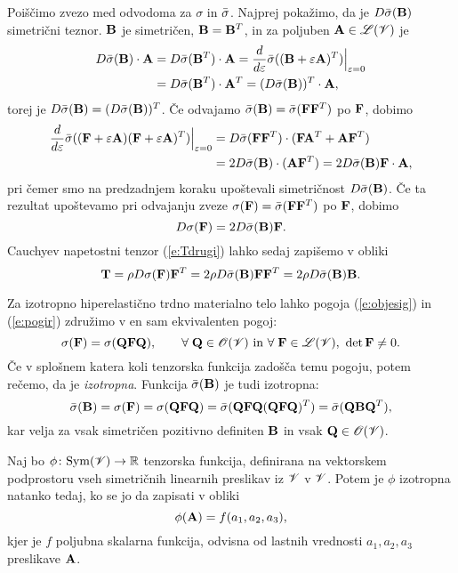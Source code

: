 Poiščimo zvezo med odvodoma za $\sigma$ in $\bar{\sigma}$. Najprej pokažimo, da je $D\bar{\sigma}(\mathbf B)$
simetrični teznor. $\mathbf B$ je simetričen, $\mathbf B=\mathbf B^{T}$, in
za poljuben $\mathbf A\in\mathscr L(\mathscr V)$ je
\begin{align*}
	D\bar{\sigma}(\mathbf B)\cdot\mathbf A&=D\bar{\sigma}(\mathbf B^T)\cdot\mathbf A=
	\frac{d}{d\varepsilon}\bar{\sigma}((\mathbf B+\varepsilon\mathbf A)^T)\Big|_{\varepsilon=0}\\
	&=D\bar{\sigma}(\mathbf B^T)\cdot\mathbf A^T=(D\bar{\sigma}(\mathbf B))^T\cdot\mathbf A,
\end{align*}
torej je $D\bar{\sigma}(\mathbf B)=(D\bar{\sigma}(\mathbf B))^T$. Če odvajamo $\bar{\sigma}(\mathbf B)=\bar{\sigma}(\mathbf F\mathbf F^T)$
po $\mathbf F$, dobimo
\begin{align*}
	\frac{d}{d\varepsilon}\bar{\sigma}((\mathbf F+\varepsilon\mathbf A)(\mathbf F+\varepsilon\mathbf A)^T)\Big|_{\varepsilon=0}&=
	D\bar{\sigma}(\mathbf F\mathbf F^T)\cdot(\mathbf F\mathbf A^T+\mathbf A\mathbf F^T)\\
	&=2D\bar{\sigma}(\mathbf B)\cdot(\mathbf A\mathbf F^T)=2D\bar{\sigma}(\mathbf B)\mathbf F\cdot\mathbf A,
\end{align*}
pri čemer smo na predzadnjem koraku upoštevali simetričnost $D\bar{\sigma}(\mathbf B)$.
Če ta rezultat upoštevamo pri odvajanju zveze $\sigma(\mathbf F)=\bar{\sigma}(\mathbf F\mathbf F^T)$
po $\mathbf F$, dobimo
\begin{equation*}
	D\sigma(\mathbf F)=2D\bar{\sigma}(\mathbf B)\mathbf F.
\end{equation*}
Cauchyev napetostni tenzor (\ref{e:Tdrugi}) lahko sedaj zapišemo v obliki
\begin{equation} \label{e:tmalodrugace}
	\mathbf T=\rho D\sigma(\mathbf F)\mathbf F^T=2\rho D\bar{\sigma}(\mathbf B)\mathbf F\mathbf F^T=2\rho D\bar{\sigma}(\mathbf B)\mathbf B.
\end{equation}

Za izotropno hiperelastično trdno materialno telo lahko pogoja (\ref{e:objesig})
in (\ref{e:pogir}) združimo v en sam ekvivalenten pogoj:
\[
	\sigma(\mathbf F)=\sigma(\mathbf Q\mathbf F\mathbf Q),\qquad\forall\;\mathbf Q\in\mathscr{O}(\mathscr V)
	\ \textrm{in}\ \forall\;\mathbf F\in\mathscr L(\mathscr V),\ \det\mathbf F\neq 0.
\]
Če v splošnem katera koli tenzorska funkcija zadošča temu pogoju, potem rečemo,
da je \emph{izotropna}. Funkcija $\bar{\sigma}(\mathbf B)$ je tudi izotropna:
\[
	\bar{\sigma}(\mathbf B)=\sigma(\mathbf F)=\sigma(\mathbf Q\mathbf F\mathbf Q)=
	\bar{\sigma}(\mathbf Q\mathbf F\mathbf Q(\mathbf Q\mathbf F\mathbf Q)^T)=\bar{\sigma}(\mathbf Q\mathbf B\mathbf Q^T),
\]
kar velja za vsak simetričen pozitivno definiten $\mathbf B$ in vsak $\mathbf Q\in\mathscr{O}(\mathscr V)$.

\begin{izrek} \label{i:prinva}
	Naj bo $\phi\colon\mathrm{Sym}(\mathscr V)\to\mathbb R$ tenzorska funkcija, definirana
	na vektorskem podprostoru vseh simetričnih linearnih preslikav iz $\mathscr V$ v $\mathscr V$.
	Potem je $\phi$ izotropna natanko tedaj, ko se jo da zapisati v obliki
	\[
		\phi(\mathbf A)=f(a_1,a_2,a_3),
	\]
	kjer je $f$ poljubna skalarna funkcija, odvisna od lastnih vrednosti $a_1,a_2,a_3$
	preslikave $\mathbf A$.
\end{izrek}

